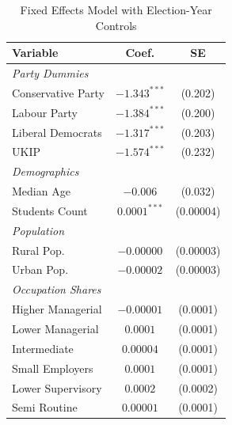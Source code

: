 \documentclass[preprint]{elsarticle} %
\begin{document}
\begin{table}[htbp]  %
	\centering
	\caption{Fixed Effects Model with Election-Year Controls}
	\label{tab:1wfe}
	\footnotesize
	\setlength{\tabcolsep}{8pt} %
	\begin{tabular}{lcc}
		\toprule
		\textbf{Variable} & \textbf{Coef.} & \textbf{SE} \\
		\midrule
		\textit{Party Dummies} \\
		\hspace{3mm}Conservative Party & $-1.343^{***}$ & (0.202) \\
		\hspace{3mm}Labour Party & $-1.384^{***}$ & (0.200) \\
		\hspace{3mm}Liberal Democrats & $-1.317^{***}$ & (0.203) \\
		\hspace{3mm}UKIP & $-1.574^{***}$ & (0.232) \\
		\textit{Demographics} \\
		\hspace{3mm}Median Age & $-0.006$ & (0.032) \\
		\hspace{3mm}Students Count & $0.0001^{***}$ & (0.00004) \\
		\textit{Population} \\
		\hspace{3mm}Rural Pop. & $-0.00000$ & (0.00003) \\
		\hspace{3mm}Urban Pop. & $-0.00002$ & (0.00003) \\
		\textit{Occupation Shares} \\
		\hspace{3mm}Higher Managerial & $-0.00001$ & (0.0001) \\
		\hspace{3mm}Lower Managerial & $0.0001$ & (0.0001) \\
		\hspace{3mm}Intermediate & $0.00004$ & (0.0001) \\
		\hspace{3mm}Small Employers & $0.0001$ & (0.0001) \\
		\hspace{3mm}Lower Supervisory & $0.0002$ & (0.0002) \\
		\hspace{3mm}Semi Routine & $0.00001$ & (0.0001) \\

\end{tabular}
\end{table}
\end{document}
